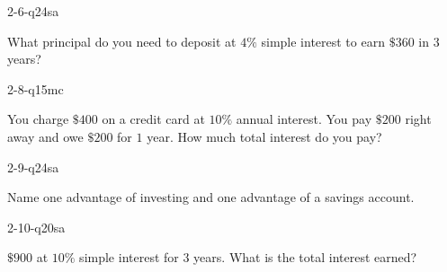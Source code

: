 \begin{practiceQuestion}{2-6-q24}{sa}
\begin{questionText}
What principal do you need to deposit at $4\%$ simple interest to earn $\$360$ in $3$ years?
\end{questionText}
\end{practiceQuestion}

\begin{practiceQuestion}{2-8-q15}{mc}
\begin{questionText}
You charge $\$400$ on a credit card at $10\%$ annual interest. You pay $\$200$ right away and owe $\$200$ for $1$ year. How much total interest do you pay?
\end{questionText}
\end{practiceQuestion}

\begin{practiceQuestion}{2-9-q24}{sa}
\begin{questionText}
Name one advantage of investing and one advantage of a savings account.
\end{questionText}
\end{practiceQuestion}

\begin{practiceQuestion}{2-10-q20}{sa}
\begin{questionText}
$\$900$ at $10\%$ simple interest for $3$ years. What is the total interest earned?
\end{questionText}
\end{practiceQuestion}

